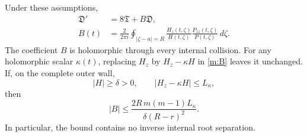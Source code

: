 \begin{theorem}
\label{m:evolution}
Under these assumptions,
\begin{align}
 \mathfrak D'&=8\mathfrak T+B\mathfrak D,
                                                        \label{m:ode}\\
 B(t)&=\frac{2}{2\pi i}\oint_{|\zeta-a|=R}
        \frac{H_z(t,\zeta)}{H(t,\zeta)}
        \frac{P_{zz}(t,\zeta)}{P(t,\zeta)}\,d\zeta.
                                                        \label{m:B}
\end{align}
The coefficient $B$ is holomorphic through every internal
collision.  For any holomorphic scalar $\kappa(t)$, replacing $H_z$
by $H_z-\kappa H$ in \eqref{m:B} leaves it unchanged.  If, on the
complete outer wall,
\begin{equation}\label{m:wallinputs}
 |H|\geq\delta>0,\qquad |H_z-\kappa H|\leq L_\kappa,
\end{equation}
then
\begin{equation}\label{m:Bbound}
 |B|\leq
 \frac{2R\,m(m-1)L_\kappa}{\delta(R-r)^2}.
\end{equation}
In particular, the bound contains no inverse internal root separation.
\end{theorem}

